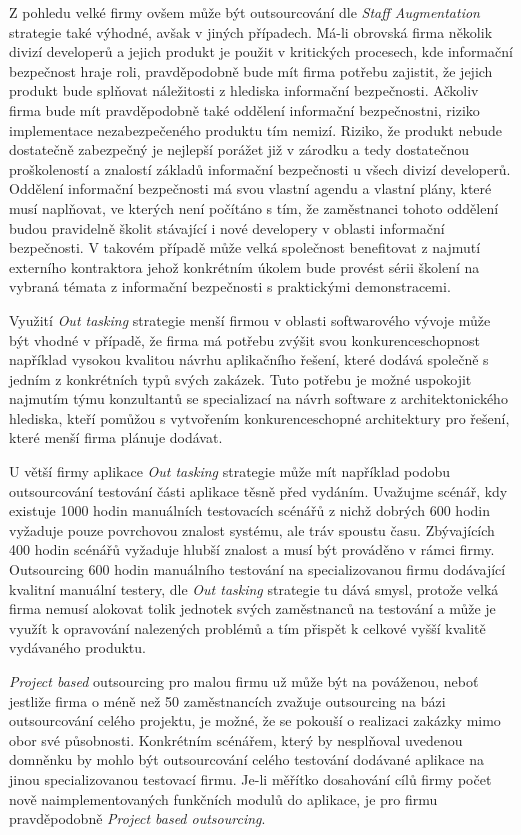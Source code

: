 \documentclass[a4paper,12pt]{article}
\begin{document}
    Z pohledu velké firmy ovšem může být outsourcování dle \textit{Staff Augmentation} strategie také výhodné, avšak v jiných případech. Má-li obrovská firma několik divizí developerů a jejich produkt je použit v kritických procesech, kde informační bezpečnost hraje roli, pravděpodobně bude mít firma potřebu zajistit, že jejich produkt bude splňovat náležitosti z hlediska informační bezpečnosti. Ačkoliv firma bude mít pravděpodobně také oddělení informační bezpečnostni, riziko implementace nezabezpečeného produktu tím nemizí. Riziko, že produkt nebude dostatečně zabezpečný je nejlepší porážet již v zárodku a tedy dostatečnou proškoleností a znalostí základů informační bezpečnosti u všech divizí developerů. Oddělení informační bezpečnosti má svou vlastní agendu a vlastní plány, které musí naplňovat, ve kterých není počítáno s tím, že zaměstnanci tohoto oddělení budou pravidelně školit stávající i nové developery v oblasti informační bezpečnosti. V takovém případě může velká společnost benefitovat z najmutí externího kontraktora jehož konkrétním úkolem bude provést sérii školení na vybraná témata z informační bezpečnosti s praktickými demonstracemi. 

    Využití \textit{Out tasking} strategie menší firmou v oblasti softwarového vývoje může být vhodné v případě, že firma má potřebu zvýšit svou konkurenceschopnost například vysokou kvalitou návrhu aplikačního řešení, které dodává společně s jedním z konkrétních typů svých zakázek. Tuto potřebu je možné uspokojit najmutím týmu konzultantů se specializací na návrh software z architektonického hlediska, kteří pomůžou s vytvořením konkurenceschopné architektury pro řešení, které menší firma plánuje dodávat. 

    U větší firmy aplikace \textit{Out tasking} strategie může mít například podobu outsourcování testování části aplikace těsně před vydáním. Uvažujme scénář, kdy existuje 1000 hodin manuálních testovacích scénářů z nichž dobrých 600 hodin vyžaduje pouze povrchovou znalost systému, ale tráv spoustu času. Zbývajících 400 hodin scénářů vyžaduje hlubší znalost a musí být prováděno v rámci firmy. Outsourcing 600 hodin manuálního testování na specializovanou firmu dodávající kvalitní manuální testery, dle \textit{Out tasking} strategie tu dává smysl, protože velká firma nemusí alokovat tolik jednotek svých zaměstnanců na testování a může je využít k opravování nalezených problémů a tím přispět k celkové vyšší kvalitě vydávaného produktu.

    \textit{Project based} outsourcing pro malou firmu už může být na pováženou, neboť jestliže firma o méně než 50 zaměstnancích zvažuje outsourcing na bázi outsourcování celého projektu, je možné, že se pokouší o realizaci zakázky mimo obor své působnosti. Konkrétním scénářem, který by nesplňoval uvedenou domněnku by mohlo být outsourcování celého testování dodávané aplikace na jinou specializovanou testovací firmu. Je-li měřítko dosahování cílů firmy počet nově naimplementovaných funkčních modulů do aplikace, je pro firmu pravděpodobně \textit{Project based outsourcing}.
\end{document}
